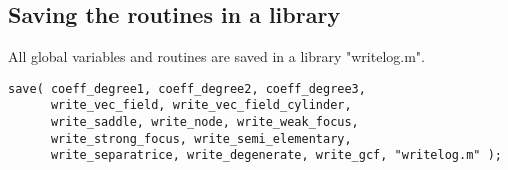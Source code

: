 \documentclass[a4paper,10pt]{article}
\begin{document}
\subsection{Saving the routines in a library}

All global variables and routines are saved in a library "writelog.m".

\begin{lstlisting}[name=writelog]
save( coeff_degree1, coeff_degree2, coeff_degree3,
      write_vec_field, write_vec_field_cylinder,
      write_saddle, write_node, write_weak_focus,
      write_strong_focus, write_semi_elementary,
      write_separatrice, write_degenerate, write_gcf, "writelog.m" );
\end{lstlisting}
\end{document}
